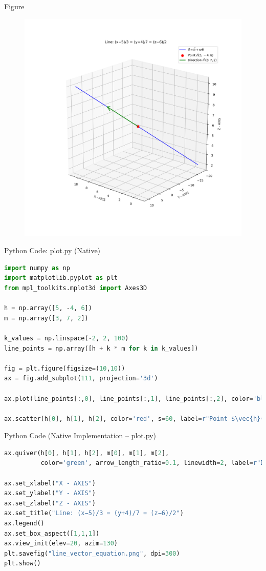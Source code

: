 \documentclass{beamer}
\begin{document}
\begin{frame}{Figure}
    \begin{figure}[h!]
    \centering
    \includegraphics[width=0.7\linewidth]{figs/fig.png}
    \caption{}
    \label{fig:3DVectors}
\end{figure}
\end{frame}

\begin{frame}[fragile]{Python Code: plot.py (Native)}
\begin{lstlisting}[language=Python]
import numpy as np
import matplotlib.pyplot as plt
from mpl_toolkits.mplot3d import Axes3D

h = np.array([5, -4, 6])  
m = np.array([3, 7, 2])  

k_values = np.linspace(-2, 2, 100)
line_points = np.array([h + k * m for k in k_values])

fig = plt.figure(figsize=(10,10))
ax = fig.add_subplot(111, projection='3d')

ax.plot(line_points[:,0], line_points[:,1], line_points[:,2], color='blue', label=r"$\vec{x} = \vec{h} + \kappa \vec{m}$")

ax.scatter(h[0], h[1], h[2], color='red', s=60, label=r"Point $\vec{h}(5, -4, 6)$")
\end{lstlisting}
\end{frame}


\begin{frame}[fragile]{Python Code (Native Implementation – plot.py)}
\begin{lstlisting}[language=Python]
ax.quiver(h[0], h[1], h[2], m[0], m[1], m[2], 
          color='green', arrow_length_ratio=0.1, linewidth=2, label=r"Direction $\vec{m}(3,7,2)$")

ax.set_xlabel("X - AXIS")
ax.set_ylabel("Y - AXIS")
ax.set_zlabel("Z - AXIS")
ax.set_title("Line: (x−5)/3 = (y+4)/7 = (z−6)/2")
ax.legend()
ax.set_box_aspect([1,1,1]) 
ax.view_init(elev=20, azim=130)
plt.savefig("line_vector_equation.png", dpi=300)
plt.show()
\end{lstlisting}
\end{frame}
\end{document}
